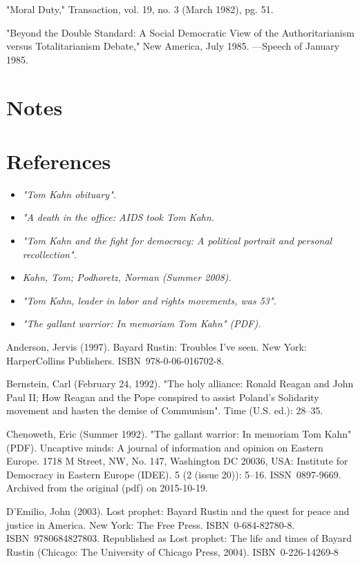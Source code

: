 "Moral Duty," Transaction, vol. 19, no. 3 (March 1982), pg. 51.

"Beyond the Double Standard: A Social Democratic View of the
Authoritarianism versus Totalitarianism Debate," New America, July 1985.
---Speech of January 1985.

\section{Notes}\label{notes}

\section{References}\label{references}

\begin{itemize}
\item
  \emph{"Tom Kahn obituary".}
\item
  \emph{"A death in the office: AIDS took Tom Kahn.}
\item
  \emph{"Tom Kahn and the fight for democracy: A political portrait and
  personal recollection".}
\item
  \emph{Kahn, Tom; Podhoretz, Norman (Summer 2008).}
\item
  \emph{"Tom Kahn, leader in labor and rights movements, was 53".}
\item
  \emph{"The gallant warrior: In memoriam Tom Kahn" (PDF).}
\end{itemize}

Anderson, Jervis (1997). Bayard Rustin: Troubles I've seen. New York:
HarperCollins Publishers. ISBN~978-0-06-016702-8.

Bernstein, Carl (February 24, 1992). "The holy alliance: Ronald Reagan
and John Paul II; How Reagan and the Pope conspired to assist Poland's
Solidarity movement and hasten the demise of Communism". Time (U.S.
ed.): 28--35.

Chenoweth, Eric (Summer 1992). "The gallant warrior: In memoriam Tom
Kahn" (PDF). Uncaptive minds: A journal of information and opinion on
Eastern Europe. 1718 M Street, NW, No. 147, Washington DC 20036, USA:
Institute for Democracy in Eastern Europe (IDEE). 5 (2 (issue 20)):
5--16. ISSN~0897-9669. Archived from the original (pdf) on 2015-10-19.

D'Emilio, John (2003). Lost prophet: Bayard Rustin and the quest for
peace and justice in America. New York: The Free Press.
ISBN~0-684-82780-8. ISBN~9780684827803. Republished as Lost prophet: The
life and times of Bayard Rustin (Chicago: The University of Chicago
Press, 2004). ISBN~0-226-14269-8

